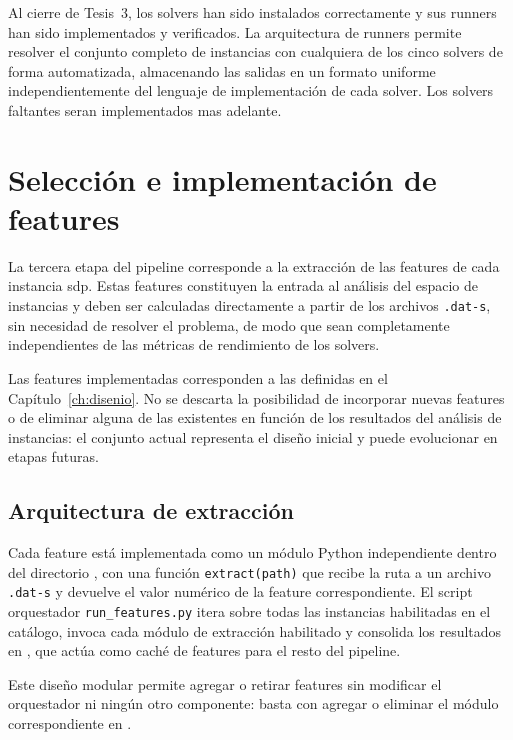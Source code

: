Al cierre de Tesis~3, los solvers han sido instalados correctamente y sus
runners han sido implementados y verificados.
La arquitectura de runners permite resolver el conjunto completo de instancias con
cualquiera de los cinco solvers de forma automatizada, almacenando las salidas en un
formato uniforme independientemente del lenguaje de implementación de cada solver.
Los solvers faltantes seran implementados mas adelante.


\section{Selección e implementación de features}
\label{sec:avance_features}

La tercera etapa del pipeline corresponde a la extracción de las features
de cada instancia \acrshort{sdp}.
Estas features constituyen la entrada al análisis del espacio de instancias y deben
ser calculadas directamente a partir de los archivos \texttt{.dat-s}, sin necesidad
de resolver el problema, de modo que sean completamente independientes de las
métricas de rendimiento de los solvers.

Las features implementadas corresponden a las definidas en el
Capítulo~\ref{ch:disenio}.
No se descarta la posibilidad de incorporar nuevas features o de eliminar alguna de
las existentes en función de los resultados del análisis de instancias: el conjunto
actual representa el diseño inicial y puede evolucionar en etapas futuras.

\newpage
\subsection{Arquitectura de extracción}
\label{subsec:avance_features_arquitectura}

Cada feature está implementada como un módulo Python independiente dentro del
directorio , con una función \texttt{extract(path)}
que recibe la ruta a un archivo \texttt{.dat-s} y devuelve el valor numérico de la
feature correspondiente.
El script orquestador \texttt{run\_features.py} itera sobre todas las instancias
habilitadas en el catálogo, invoca cada módulo de extracción habilitado y consolida los
resultados en , que actúa como caché de
features para el resto del pipeline.

Este diseño modular permite agregar o retirar features sin modificar el orquestador
ni ningún otro componente: basta con agregar o eliminar el módulo correspondiente
en .

